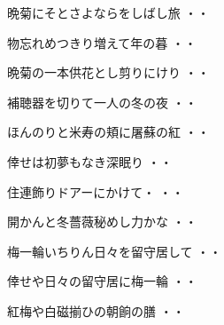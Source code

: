 \begin{shiika}晩菊にそとさよならをしばし旅
\hfill{・・}\end{shiika}
\vspace{0.6cm}
\begin{shiika}物忘れめつきり増えて年の暮
\hfill{・・}\end{shiika}
\vspace{0.6cm}
\begin{shiika}晩菊の一本供花とし剪りにけり
\hfill{・・}\end{shiika}
\vspace{0.6cm}
\begin{shiika}補聴器を切りて一人の冬の夜
\hfill{・・}\end{shiika}
\vspace{0.6cm}
\begin{shiika}ほんのりと米寿の頬に屠蘇の紅
\hfill{・・}\end{shiika}
\vspace{0.6cm}
\begin{shiika}倖せは初夢もなき深眠り
\hfill{・・}\end{shiika}
\vspace{0.6cm}
\begin{shiika}住連飾りドアーにかけて・
\hfill{・・}\end{shiika}
\vspace{0.6cm}
\begin{shiika}開かんと冬薔薇秘めし力かな
\hfill{・・}\end{shiika}
\vspace{0.6cm}
\begin{shiika}梅一輪いちりん日々を留守居して
\hfill{・・}\end{shiika}
\vspace{0.6cm}
\begin{shiika}倖せや日々の留守居に梅一輪
\hfill{・・}\end{shiika}
\vspace{0.6cm}
\begin{shiika}紅梅や白磁揃ひの朝餉の膳
\hfill{・・}\end{shiika}
\vspace{0.6cm}
